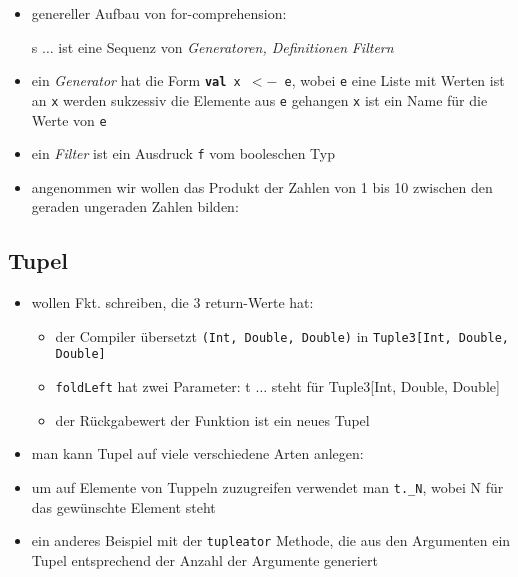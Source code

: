 \begin{itemize}
\begin{itemize}
    \item genereller Aufbau von for-comprehension:
    
    \begin{shadowminipage}
    
    \end{shadowminipage}
    
    
    s $\ldots$ ist eine Sequenz von \textit{Generatoren, Definitionen}
    \und \textit{Filtern}
    \item ein \textit{Generator} hat die Form 
    \texttt{\textbf{val} x $<-$ e}, wobei
    \texttt{e} eine Liste mit Werten ist \und an \texttt{x} 
    werden sukzessiv die Elemente aus \texttt{e} gehangen
    \texttt{x} ist ein Name für die Werte von \texttt{e}
    \item ein \textit{Filter} ist ein Ausdruck \texttt{f} vom 
    booleschen Typ
    \item angenommen wir wollen das Produkt der Zahlen von 1 bis 10
    zwischen den geraden \und ungeraden Zahlen bilden:
    
    
 
  \end{itemize}
\end{itemize}


\subsection{Tupel}
\begin{itemize}
  \item wollen Fkt. schreiben, die 3 return-Werte hat:
  
  
  
  \begin{itemize}
    \item der Compiler übersetzt \texttt{(Int, Double, Double)} in
    \texttt{Tuple3[Int, Double, Double]}
    \item \texttt{foldLeft} hat zwei Parameter: t $\ldots$ steht für 
    Tuple3[Int, Double, Double]
    \item der Rückgabewert der Funktion ist ein neues Tupel
  \end{itemize}
  \item man kann Tupel auf viele verschiedene Arten anlegen:
  
  
  
  \item um auf Elemente von Tuppeln zuzugreifen verwendet man
  \texttt{t.\_N}, wobei N für das gewünschte Element steht
  \item ein anderes Beispiel mit der \texttt{tupleator} Methode, die aus den
  Argumenten ein Tupel entsprechend der Anzahl der Argumente generiert
  
  
\end{itemize}


